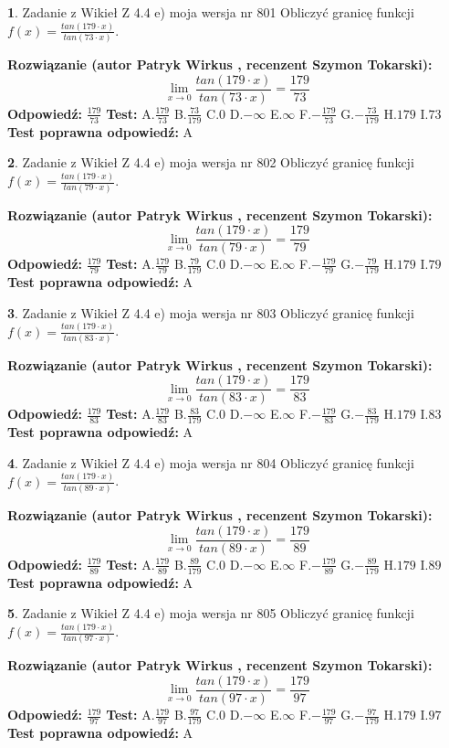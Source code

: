 \documentclass[12pt, a4paper]{article}
\theoremstyle{definition} %
\newtheorem{zad}{}
\newcommand{\zadStart}[1]{\begin{zad}#1\newline}
\newcommand{\zadStop}{\end{zad}}
\newcommand{\rozwStart}[2]{\noindent \textbf{Rozwiązanie (autor #1 , recenzent #2): }\newline}
\newcommand{\rozwStop}{\newline}
\newcommand{\odpStart}{\noindent \textbf{Odpowiedź:}\newline}
\newcommand{\odpStop}{\newline}
\newcommand{\testStart}{\noindent \textbf{Test:}\newline}
\newcommand{\testStop}{\newline}
\newcommand{\kluczStart}{\noindent \textbf{Test poprawna odpowiedź:}\newline}
\newcommand{\kluczStop}{\newline}
\begin{document}
\zadStart{Zadanie z Wikieł Z 4.4 e) moja wersja nr 801}
Obliczyć granicę funkcji $f(x)=\frac{tan(179\cdot x)}{tan(73\cdot x)}$.
\zadStop
\rozwStart{Patryk Wirkus}{Szymon Tokarski}
$$\lim\limits_{x\to 0}\frac{tan(179\cdot x)}{tan(73\cdot x)}=
\frac{179}{73}$$
\rozwStop
\odpStart
$\frac{179}{73}$
\odpStop
\testStart
A.$\frac{179}{73}$
B.$\frac{73}{179}$
C.$0$
D.$-\infty$
E.$\infty$
F.$-\frac{179}{73}$
G.$-\frac{73}{179}$
H.$179$
I.$73$
\testStop
\kluczStart
A
\kluczStop



\zadStart{Zadanie z Wikieł Z 4.4 e) moja wersja nr 802}
Obliczyć granicę funkcji $f(x)=\frac{tan(179\cdot x)}{tan(79\cdot x)}$.
\zadStop
\rozwStart{Patryk Wirkus}{Szymon Tokarski}
$$\lim\limits_{x\to 0}\frac{tan(179\cdot x)}{tan(79\cdot x)}=
\frac{179}{79}$$
\rozwStop
\odpStart
$\frac{179}{79}$
\odpStop
\testStart
A.$\frac{179}{79}$
B.$\frac{79}{179}$
C.$0$
D.$-\infty$
E.$\infty$
F.$-\frac{179}{79}$
G.$-\frac{79}{179}$
H.$179$
I.$79$
\testStop
\kluczStart
A
\kluczStop



\zadStart{Zadanie z Wikieł Z 4.4 e) moja wersja nr 803}
Obliczyć granicę funkcji $f(x)=\frac{tan(179\cdot x)}{tan(83\cdot x)}$.
\zadStop
\rozwStart{Patryk Wirkus}{Szymon Tokarski}
$$\lim\limits_{x\to 0}\frac{tan(179\cdot x)}{tan(83\cdot x)}=
\frac{179}{83}$$
\rozwStop
\odpStart
$\frac{179}{83}$
\odpStop
\testStart
A.$\frac{179}{83}$
B.$\frac{83}{179}$
C.$0$
D.$-\infty$
E.$\infty$
F.$-\frac{179}{83}$
G.$-\frac{83}{179}$
H.$179$
I.$83$
\testStop
\kluczStart
A
\kluczStop



\zadStart{Zadanie z Wikieł Z 4.4 e) moja wersja nr 804}
Obliczyć granicę funkcji $f(x)=\frac{tan(179\cdot x)}{tan(89\cdot x)}$.
\zadStop
\rozwStart{Patryk Wirkus}{Szymon Tokarski}
$$\lim\limits_{x\to 0}\frac{tan(179\cdot x)}{tan(89\cdot x)}=
\frac{179}{89}$$
\rozwStop
\odpStart
$\frac{179}{89}$
\odpStop
\testStart
A.$\frac{179}{89}$
B.$\frac{89}{179}$
C.$0$
D.$-\infty$
E.$\infty$
F.$-\frac{179}{89}$
G.$-\frac{89}{179}$
H.$179$
I.$89$
\testStop
\kluczStart
A
\kluczStop



\zadStart{Zadanie z Wikieł Z 4.4 e) moja wersja nr 805}
Obliczyć granicę funkcji $f(x)=\frac{tan(179\cdot x)}{tan(97\cdot x)}$.
\zadStop
\rozwStart{Patryk Wirkus}{Szymon Tokarski}
$$\lim\limits_{x\to 0}\frac{tan(179\cdot x)}{tan(97\cdot x)}=
\frac{179}{97}$$
\rozwStop
\odpStart
$\frac{179}{97}$
\odpStop
\testStart
A.$\frac{179}{97}$
B.$\frac{97}{179}$
C.$0$
D.$-\infty$
E.$\infty$
F.$-\frac{179}{97}$
G.$-\frac{97}{179}$
H.$179$
I.$97$
\testStop
\kluczStart
A
\kluczStop
\end{document}
